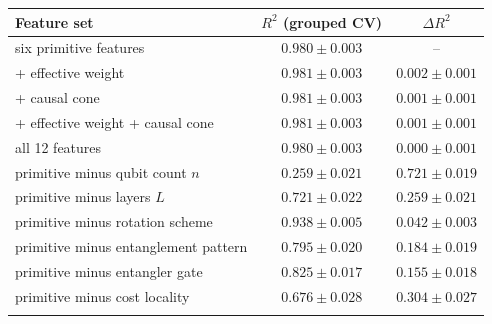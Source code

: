 \begin{tabular}{lcc}
\toprule
Feature set & $R^2$ (grouped CV) & $\Delta R^2$ \\
\midrule
six primitive features & $0.980 \pm 0.003$ & -- \\
\quad + effective weight & $0.981 \pm 0.003$ & $0.002 \pm 0.001$ \\
\quad + causal cone & $0.981 \pm 0.003$ & $0.001 \pm 0.001$ \\
\quad + effective weight + causal cone & $0.981 \pm 0.003$ & $0.001 \pm 0.001$ \\
all 12 features & $0.980 \pm 0.003$ & $0.000 \pm 0.001$ \\
\midrule
primitive minus qubit count $n$ & $0.259 \pm 0.021$ & $0.721 \pm 0.019$ \\
primitive minus layers $L$ & $0.721 \pm 0.022$ & $0.259 \pm 0.021$ \\
primitive minus rotation scheme & $0.938 \pm 0.005$ & $0.042 \pm 0.003$ \\
primitive minus entanglement pattern & $0.795 \pm 0.020$ & $0.184 \pm 0.019$ \\
primitive minus entangler gate & $0.825 \pm 0.017$ & $0.155 \pm 0.018$ \\
primitive minus cost locality & $0.676 \pm 0.028$ & $0.304 \pm 0.027$ \\
\botrule
\end{tabular}
